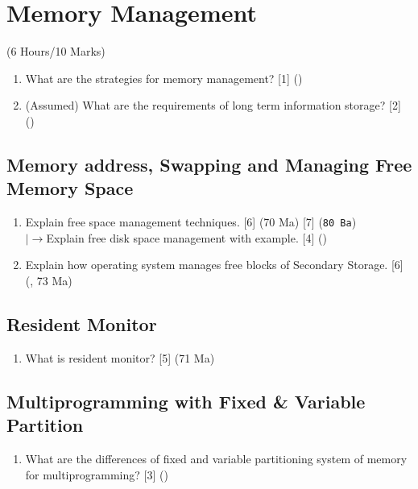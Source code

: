 \documentclass[12pt]{article}
\newcommand{\lb}{\\$\left|\rightarrow\right.$}
\begin{document}
	\pagebreak

\section{Memory Management}
	\begin{center}(6 Hours/10 Marks)\end{center}
	
	\begin{enumerate}
		\item What are the strategies for memory management? \hfill [1] ()

		\item (Assumed) What are the requirements of long term information storage? \hfill [2] ()
	\end{enumerate}

	\subsection{Memory address, Swapping and Managing Free Memory Space}
		\begin{enumerate}
			\item Explain free space management techniques. \hfill [6] (70 Ma) [7] (\texttt{80 Ba})
			\lb Explain free disk space management with example. \hfill [4] ()

			\item Explain how operating system manages free blocks of Secondary Storage. \hfill [6] (, 73 Ma)
		\end{enumerate}

	\subsection{Resident Monitor}
		\begin{enumerate}
			\item What is resident monitor? \hfill [5] (71 Ma)
		\end{enumerate}

	\subsection{Multiprogramming with Fixed \& Variable Partition}
		\begin{enumerate}
			\item What are the differences of fixed and variable partitioning system of memory for multiprogramming? \hfill [3] ()
		\end{enumerate}
		
\end{document}
